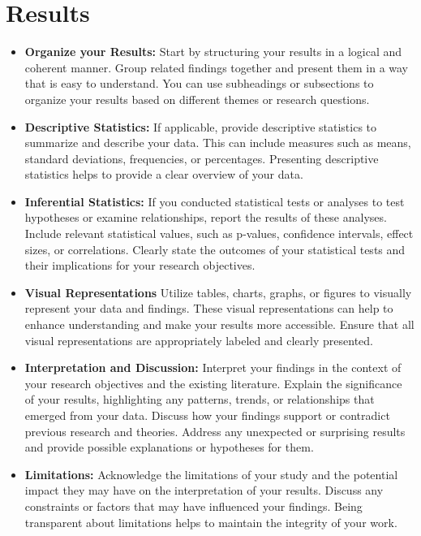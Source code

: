 \documentclass[conference]{IEEEtran}
\begin{document}
\section{Results}
\begin{itemize}
	\item \textbf{Organize your Results:} Start by structuring your results in a logical and coherent manner. Group related findings together and present them in a way that is easy to understand. You can use subheadings or subsections to organize your results based on different themes or research questions.
	\item \textbf{Descriptive Statistics:} If applicable, provide descriptive statistics to summarize and describe your data. This can include measures such as means, standard deviations, frequencies, or percentages. Presenting descriptive statistics helps to provide a clear overview of your data.
	\item \textbf{Inferential Statistics:} If you conducted statistical tests or analyses to test hypotheses or examine relationships, report the results of these analyses. Include relevant statistical values, such as p-values, confidence intervals, effect sizes, or correlations. Clearly state the outcomes of your statistical tests and their implications for your research objectives.
	\item \textbf{Visual Representations} Utilize tables, charts, graphs, or figures to visually represent your data and findings. These visual representations can help to enhance understanding and make your results more accessible. Ensure that all visual representations are appropriately labeled and clearly presented.
	\item \textbf{Interpretation and Discussion:} Interpret your findings in the context of your research objectives and the existing literature. Explain the significance of your results, highlighting any patterns, trends, or relationships that emerged from your data. Discuss how your findings support or contradict previous research and theories. Address any unexpected or surprising results and provide possible explanations or hypotheses for them.
	\item \textbf{Limitations:} Acknowledge the limitations of your study and the potential impact they may have on the interpretation of your results. Discuss any constraints or factors that may have influenced your findings. Being transparent about limitations helps to maintain the integrity of your work.
\end{itemize}
\end{document}
